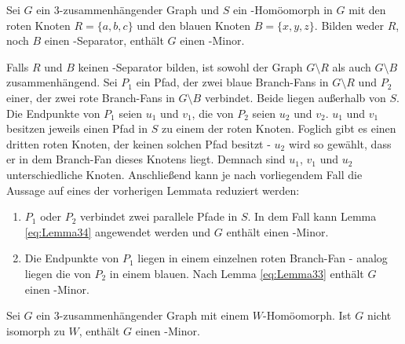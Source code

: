 \begin{lemma}\label{eq:Lemma35}
  Sei $G$ ein $3$-zusammenhängender Graph und $S$ ein \kdd-Homöomorph in $G$ mit den roten Knoten $R = \{a, b, c\}$ und den blauen Knoten $B = \{x, y, z\}$.
  Bilden weder $R$, noch $B$ einen \dd-Separator, enthält $G$ einen \kf-Minor.
\end{lemma}
\begin{beweis}
  Falls $R$ und $B$ keinen \dd-Separator bilden, ist sowohl der Graph $G \setminus R$ als auch $G \setminus B$ zusammenhängend.
  Sei $P_1$ ein Pfad, der zwei blaue Branch-Fans in $G \setminus R$ und $P_2$ einer, der zwei rote Branch-Fans in $G \setminus B$ verbindet.
  Beide liegen außerhalb von $S$.
  Die Endpunkte von $P_1$ seien $u_1$ und $v_1$, die von $P_2$ seien $u_2$ und $v_2$.
  $u_1$ und $v_1$ besitzen jeweils einen Pfad in $S$ zu einem der roten Knoten.
  Foglich gibt es einen dritten roten Knoten, der keinen solchen Pfad besitzt - $u_2$ wird so gewählt, dass er in dem Branch-Fan dieses Knotens liegt. %
  Demnach sind $u_1$, $v_1$ und $u_2$ unterschiedliche Knoten.
  Anschließend kann je nach vorliegendem Fall die Aussage auf eines der vorherigen Lemmata reduziert werden:
  \begin{enumerate}
    \item $P_1$ oder $P_2$ verbindet zwei parallele Pfade in $S$.
          In dem Fall kann Lemma \ref{eq:Lemma34} angewendet werden und $G$ enthält einen \kf-Minor.
    \item Die Endpunkte von $P_1$ liegen in einem einzelnen roten Branch-Fan - analog liegen die von $P_2$ in einem blauen.
          Nach Lemma \ref{eq:Lemma33} enthält $G$ einen \kf-Minor.
  \end{enumerate}
\end{beweis}

\begin{lemma}\label{eq:Lemma36}
  Sei $G$ ein $3$-zusammenhängender Graph mit einem $W$-Homöomorph.
  Ist $G$ nicht isomorph zu $W$, enthält $G$ einen \kf-Minor.
\end{lemma}

